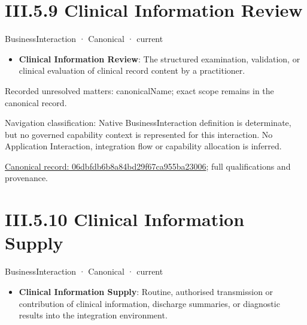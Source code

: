 \section*{III.5.9 Clinical Information Review}
\label{navigation:III.5.9}

\label{element:06dbfdb6b8a84bd29f67ca955ba23006}
{\small BusinessInteraction · Canonical · current}\par

\begin{itemize}


\item \textbf{Clinical Information Review}: The structured examination, validation, or clinical evaluation of clinical record content by a practitioner.

\end{itemize}

{\small Recorded unresolved matters: canonicalName; exact scope remains in the canonical record.}\par
{\small Navigation classification: Native BusinessInteraction definition is determinate, but no governed capability context is represented for this interaction. No Application Interaction, integration flow or capability allocation is inferred.}\par
{\footnotesize \href{../../../../../../../continuum/business/business-interaction/06dbfdb6b8a84bd29f67ca955ba23006.md}{Canonical record: 06dbfdb6b8a84bd29f67ca955ba23006}; full qualifications and provenance.}\par
\section*{III.5.10 Clinical Information Supply}
\label{navigation:III.5.10}

\label{element:a6e2525ea3294ee3ab9a4ec3dd4dfe9f}
{\small BusinessInteraction · Canonical · current}\par

\begin{itemize}


\item \textbf{Clinical Information Supply}: Routine, authorised transmission or contribution of clinical information, discharge summaries, or diagnostic results into the integration environment.

\end{itemize}

